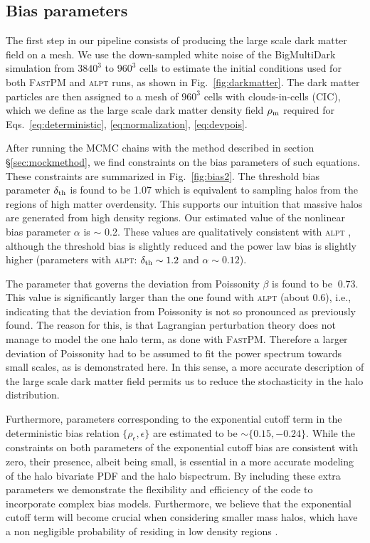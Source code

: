 \subsection{Bias parameters}

The first step in our pipeline consists of producing the large scale dark matter field on a mesh. We use the down-sampled  white noise of the BigMultiDark simulation from $3840^3$ to $960^3$ cells to estimate the initial conditions used for both \textsc{FastPM} and \textsc{alpt} runs, as shown in Fig.~\ref{fig:darkmatter}. The dark matter particles are then assigned to a mesh of $960^3$ cells with clouds-in-cells (CIC), which we define as the large scale dark matter density field $\rho_{\rm m}$ required for Eqs.~\ref{eq:deterministic}, \ref{eq:normalization}, \ref{eq:devpois}. 

After running the MCMC chains with the method described in section \S \ref{sec:mockmethod}, we find constraints on the bias parameters of such equations. These constraints are summarized in Fig.~\ref{fig:bias2}.  
The threshold bias parameter $\delta_{\rm th}$ is found to be 1.07 which is equivalent to sampling halos from the regions of high matter overdensity. This supports our intuition that massive halos are generated from high density regions. Our estimated value of the nonlinear bias parameter $\alpha$ is $\sim$ 0.2. These values are qualitatively consistent with \textsc{alpt} \citep{kitaura2014}, although the threshold bias is slightly reduced and the power law bias is slightly higher (parameters with \textsc{alpt}: $\delta_{\rm th} \sim 1.2$ and $\alpha \sim 0.12$).

The parameter that governs the deviation from Poissonity $\beta$ is found to be $~ 0.73$. This value is significantly larger than the one found with \textsc{alpt} (about 0.6), i.e., indicating that the deviation from Poissonity is not so pronounced as previously found. The reason for this, is that Lagrangian perturbation theory does not manage to model the one halo term, as done with \textsc{FastPM}. Therefore a larger deviation of Poissonity had to be assumed to fit the power spectrum towards small scales, as is demonstrated here. In this sense, a more accurate description of the large scale dark matter field permits us to reduce the stochasticity in the halo distribution.

Furthermore, parameters corresponding to the exponential cutoff term in the deterministic bias relation $\{\rho_{\epsilon},\epsilon\}$ are estimated to be $\sim \{0.15,-0.24\}$. While the constraints on both parameters of the exponential cutoff bias are consistent with zero, their presence, albeit being small, is essential in a more accurate modeling of the halo bivariate PDF and the halo bispectrum. By including these extra parameters we demonstrate the flexibility and  efficiency of the code to incorporate complex bias models. Furthermore, we believe that the  exponential cutoff term will become crucial when considering smaller mass halos, which have a non negligible probability of residing in low density regions \citep[][]{neyrinck2014}.


